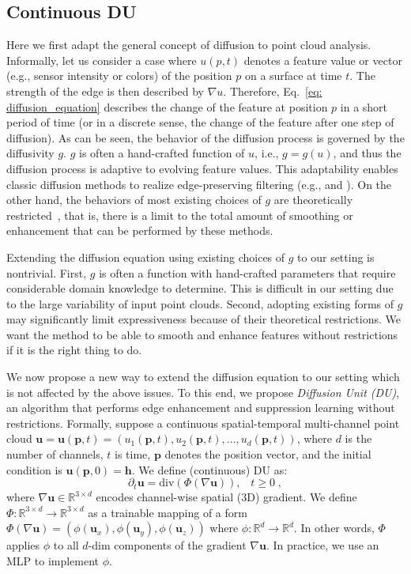 \documentclass[a4paper,fleqn]{cas-dc}
\begin{document}
\subsection{Continuous DU}
\label{sec: diffusion_unit}
Here we first adapt the general concept of diffusion to point cloud analysis. Informally, let us consider a case where $u(p,t)$ denotes a feature value or vector (e.g., sensor intensity or colors) of the position $p$ on a surface at time $t$. The strength of the edge is then described by $\nabla u$. Therefore, Eq.~\eqref{eq: diffusion_equation} describes the change of the feature at position $p$ in a short period of time (or in a discrete sense, the change of the feature after one step of diffusion). As can be seen, the behavior of the diffusion process is governed by the diffusivity $g$. $g$ is often a hand-crafted function of $u$, i.e., $g=g(u)$, and thus the diffusion process is adaptive to evolving feature values. This adaptability enables classic diffusion methods to realize edge-preserving filtering (e.g., \cite{perona1990scale} and \cite{black1998robust}). On the other hand, the behaviors of most existing choices of $g$ are theoretically restricted~\cite{weickert1998anisotropic}, that is, there is a limit to the total amount of smoothing or enhancement that can be performed by these methods.       

Extending the diffusion equation using existing choices of $g$ to our setting is nontrivial. First, $g$ is often a function with hand-crafted parameters that require considerable domain knowledge to determine. This is difficult in our setting due to the large variability of input point clouds. Second, adopting existing forms of $g$ may significantly limit expressiveness because of their theoretical restrictions. We want the method to be able to smooth and enhance features without restrictions if it is the right thing to do.     

We now propose a new way to extend the diffusion equation to our setting which is not affected by the above issues. To this end, we propose \textit{Diffusion Unit (DU)}, an algorithm that performs edge enhancement and suppression learning without restrictions.  
Formally, suppose a continuous spatial-temporal multi-channel point cloud $\mathbf{u} = \mathbf{u}(\mathbf{p}, t) = (u_1(\mathbf{p}, t), u_2(\mathbf{p}, t), ..., u_d(\mathbf{p}, t))$, where $d$ is the number of channels, $t$ is time, $\mathbf{p}$ denotes the position vector, and the initial condition is $\mathbf{u}(\mathbf{p}, 0) = \mathbf{h}$.
We define (continuous) DU as:
\begin{equation}
        \partial_t \mathbf{u} = \mathrm{div}\left(\Phi\left(\nabla \mathbf{u}\right)\right), \;\;\; t\ge0 \;,
    \label{eq: continuous_DU}
\end{equation} 
where $\nabla \mathbf{u} \in \mathbb{R}^{3 \times d}$ encodes channel-wise spatial (3D) gradient. We define $\Phi:\mathbb{R}^{3 \times d} \to \mathbb{R}^{3 \times d}$ as a trainable mapping of a form $\Phi(\nabla \textbf{u})=\left(\phi(\textbf{u}_x), \phi(\textbf{u}_y), \phi(\textbf{u}_z)\right)$ where $\phi:\mathbb{R}^d \to \mathbb{R}^d$. In other words, $\Phi$ applies $\phi$ to all $d$-dim components of the gradient $\nabla \textbf{u}$. In practice, we use an MLP to implement $\phi$.  
\end{document}
